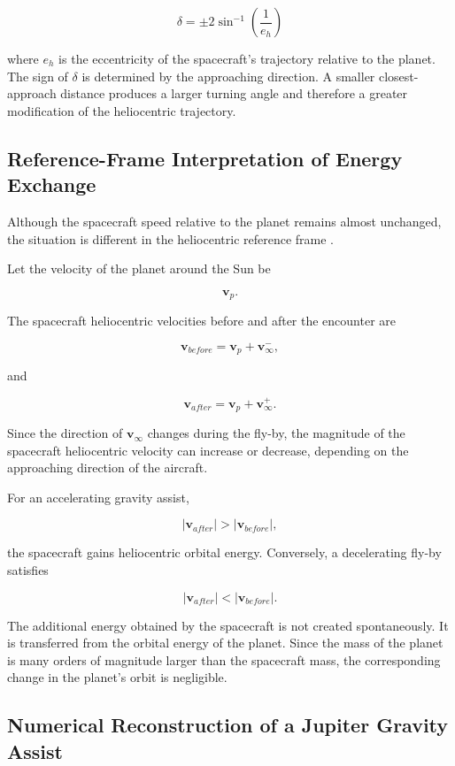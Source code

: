 \documentclass[11pt,a4paper]{article}
\begin{document}
\[
\delta
=
\pm2\sin^{-1}
\left(
\frac{1}{e_h}
\right)
\]

where $e_h$ is the eccentricity of the spacecraft's trajectory
relative to the planet. The sign of $\delta$ is determined by the approaching direction. A smaller closest-approach distance produces a larger
turning angle and therefore a greater modification of the heliocentric
trajectory.


\subsection{Reference-Frame Interpretation of Energy Exchange}

Although the spacecraft speed relative to the planet remains almost unchanged,
the situation is different in the heliocentric reference frame \cite{curtis2020}.

Let the velocity of the planet around the Sun be

\[
\mathbf{v}_p.
\]

The spacecraft heliocentric velocities before and after the encounter are

\[
\mathbf{v}_{before}
=
\mathbf{v}_p+\mathbf{v}_{\infty}^{-},
\]

and

\[
\mathbf{v}_{after}
=
\mathbf{v}_p+\mathbf{v}_{\infty}^{+}.
\]

Since the direction of $\mathbf{v}_{\infty}$ changes during the fly-by, the
magnitude of the spacecraft heliocentric velocity can increase or decrease, depending on the approaching direction of the aircraft.

For an accelerating gravity assist,

\[
|\mathbf{v}_{after}|
>
|\mathbf{v}_{before}|,
\]

the spacecraft gains heliocentric orbital energy. Conversely, a decelerating
fly-by satisfies

\[
|\mathbf{v}_{after}|
<
|\mathbf{v}_{before}|.
\]

The additional energy obtained by the spacecraft is not created
spontaneously. It is transferred from the orbital energy of the planet. Since
the mass of the planet is many orders of magnitude larger than the spacecraft
mass, the corresponding change in the planet's orbit is negligible.

\subsection{Numerical Reconstruction of a Jupiter Gravity Assist}
\end{document}
